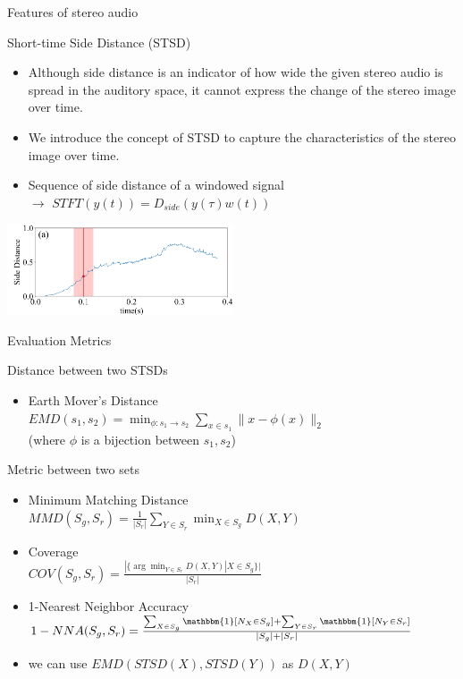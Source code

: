 \begin{frame}{Features of stereo audio}
    \begin{block}{Short-time Side Distance (STSD)}
        \begin{itemize}
            \item Although side distance is an indicator of how wide the given stereo audio is spread in the auditory space, it cannot express the change of the stereo image over time.
            \item We introduce the concept of STSD to capture the characteristics of the stereo image over time.
            \item Sequence of side distance of a windowed signal\\
            $\rightarrow$ $STFT(y(t)) = D_{side}(y(\tau)w(t))$
        \end{itemize}
        \bigskip
        \centering
        \includegraphics[width=0.5\textwidth]{Presentation/figures/stsd_ppt.png}
    \end{block}
\end{frame}

\begin{frame}{Evaluation Metrics}
    \begin{block}{Distance between two STSDs}
        \begin{itemize}
            \item Earth Mover's Distance\\
            $EMD(s_1, s_2) = \min_{\phi: s_1\to s_2} \sum_{x\in s_1} \|x-\phi(x)\|_2$\\
            (where $\phi$ is a bijection between $s_1, s_2$)
        \end{itemize}
    \end{block}
    \begin{block}{Metric between two sets}
        \begin{itemize}
            \item Minimum Matching Distance\\
            $MMD(S_g, S_r) = \frac{1}{|S_r|}\sum_{Y\in S_r} \min_{X\in S_g}D(X,Y)$
            \item Coverage\\
            $COV(S_g, S_r) = \frac{|\{\arg\min_{Y \in S_r} D(X,Y) | X \in S_g \}|}{|S_r|}$
            \item 1-Nearest Neighbor Accuracy\\
            $1-NNA(S_g, S_r) = \frac{\sum_{X\in S_g} \mathbbm{1}[N_X \in S_g] +  \sum_{Y\in S_r} \mathbbm{1}[N_Y \in S_r]}{|S_g|+|S_r|}$
            \bigskip
            \item we can use $EMD(STSD(X), STSD(Y))$ as $D(X,Y)$
        \end{itemize}
    \end{block}
\end{frame}
